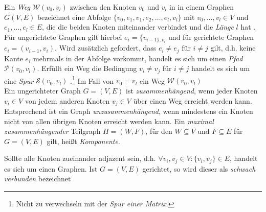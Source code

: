 \documentclass[12pt, a4paper]{report}
\begin{document}
Ein \textit{Weg} $\mathcal{W}(v_0,v_l)$ zwischen den Knoten $v_0$ und $v_l$ in in einem Graphen $G(V,E)$ bezeichnet eine Abfolge $\{v_0, e_1, v_1, e_2, \dots,e_l,v_l \}$ mit $v_0, \dots, v_l \in V$ und $e_1,\dots,e_l \in E$, die die beiden Knoten miteinander verbindet und die \textit{Länge} $l$ hat \cite{diestel2006graph}. Für ungerichtete Graphen gilt hierbei $e_i=\{v_{i-1\}, v_i}$ und für gerichtete Graphen $e_i=(v_{i-1}, v_i)$. Wird zusätzlich gefordert, dass $e_i \neq e_j$ für $i \neq j$ gilt, d.h. keine Kante $e_i$ mehrmals in der Abfolge vorkommt, handelt es sich um einen \textit{Pfad} $\mathcal{P}(v_0,v_l)$. Erfüllt ein Weg die Bedingung $v_i \neq v_j$ für $i \neq j$ handelt es sich um eine \textit{Spur} $\mathcal{S}(v_0,v_l)$  \cite{brandes2005graphfunda}.\footnote{Nicht zu verwechseln mit der \textit{Spur einer Matrix}.} Im Fall von $v_0 = v_l$ ein Weg $\mathcal{W}(v_0,v_l)$ \\
Ein ungerichteter Graph $G=(V,E)$ ist \textit{zusammenhängend}, wenn jeder Knoten $v_i \in V$ von jedem anderen Knoten $v_j \in V$ über einen Weg erreicht werden kann. Entsprechend ist ein Graph \textit{unzusammenhängend}, wenn mindestens ein Knoten nicht von allen übrigen Knoten erreicht werden kann. Ein \textit{maximal zusammenhängender} Teilgraph $H=(W,F)$, für den $W \subseteq V$ und $F \subseteq E$ für $G=(V,E)$ gilt, heißt \textit{Komponente}.

Sollte alle Knoten zueinander adjazent sein, d.h. $\forall v_i,v_j \in V : \{v_i,v_j\} \in E$, handelt es sich um einen  Graphen. Ist $G=(V,E)$ gerichtet, so wird dieser als \textit{schwach verbunden} bezeichnet



\end{document}
